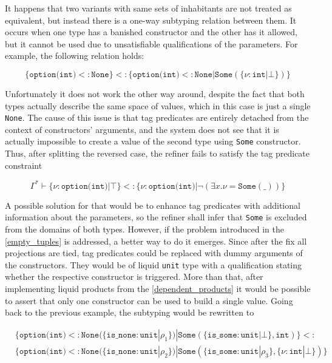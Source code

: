It happens that two variants with same sets of inhabitants are not treated as
equivalent, but instead there is a one-way subtyping relation between them. It
occurs when one type has a banished constructor and the other has it allowed,
but it cannot be used due to unsatisfiable qualifications of the parameters. For
example, the following relation holds:

$$\{\texttt{option(int)} <: \texttt{None}\} <: \{\texttt{option(int)} <:
\texttt{None} | \texttt{Some}(\{\nu : \texttt{int} | \bot\})\}$$

Unfortunately it does not work the other way around, despite the fact
that both types actually describe the same space of values, which in this case
is just a single \texttt{None}. The cause of this issue is that tag predicates
are entirely detached from the context of constructors' arguments, and the
system does not see that it is actually impossible to create a value of the
second type using \texttt{Some} constructor. Thus, after splitting the reversed
case, the refiner fails to satisfy the tag predicate constraint

$$\Gamma^* \vdash\{\nu : \texttt{option(int)} | \top\} <: \{\nu :
\texttt{option(int)} | \lnot(\exists x. \nu = \texttt{Some}(\_))\}$$

A possible solution for that would be to enhance tag predicates with additional
information about the parameters, so the refiner shall infer that \texttt{Some}
is excluded from the domains of both types. However, if the problem introduced
in the \autoref{empty_tuples} is addressed, a better way to do it emerges. Since
after the fix all projections are tied, tag predicates could be replaced with
dummy arguments of the constructors. They would be of liquid \texttt{unit} type
with a qualification stating whether the respective constructor is triggered.
More than that, after implementing liquid products from the
\autoref{dependent_products} it would be possible to assert that only one
constructor can be used to build a single value. Going back to the previous
example, the subtyping would be rewritten to

\begin{align*}
  & \{\texttt{option(int)} <: \texttt{None}(\{\texttt{is\_none} : \texttt{unit} | \rho_1\}) | \texttt{Some}(\{\texttt{is\_some} : \texttt{unit} | \bot\}, \texttt{int})\} <:\\
  & \{\texttt{option(int)} <: \texttt{None}(\{\texttt{is\_none} : \texttt{unit} | \rho_2\}) | \texttt{Some}(\{\texttt{is\_some} : \texttt{unit} | \rho_3\}, \{\nu : \texttt{int} | \bot\})\}
\end{align*}

